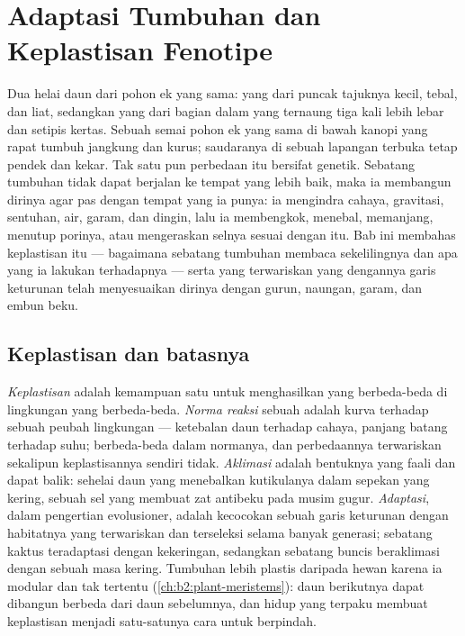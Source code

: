 \chapter{Adaptasi Tumbuhan dan Keplastisan Fenotipe}\label{ch:b2:plant-plasticity}

Dua helai daun dari pohon ek yang sama: yang dari puncak tajuknya
kecil, tebal, dan liat, sedangkan yang dari bagian dalam yang ternaung
tiga kali lebih lebar dan setipis kertas. Sebuah semai pohon ek yang
sama di bawah kanopi yang rapat tumbuh jangkung dan kurus; saudaranya
di sebuah lapangan terbuka tetap pendek dan kekar. Tak satu pun
perbedaan itu bersifat genetik. Sebatang tumbuhan tidak dapat berjalan
ke tempat yang lebih baik, maka ia membangun dirinya agar pas dengan
tempat yang ia punya: ia mengindra cahaya, gravitasi, sentuhan, air,
garam, dan dingin, lalu ia membengkok, menebal, memanjang, menutup
porinya, atau mengeraskan selnya sesuai dengan itu. Bab ini membahas
keplastisan itu --- bagaimana sebatang tumbuhan membaca sekelilingnya
dan apa yang ia lakukan terhadapnya --- serta  yang terwariskan
yang dengannya garis keturunan telah menyesuaikan dirinya dengan gurun,
naungan, garam, dan embun beku.

\section{Keplastisan dan batasnya}

\begin{definition}\label{def:b2:plant-plasticity:plasticity}
\emph{Keplastisan } adalah kemampuan satu  untuk
menghasilkan  yang berbeda-beda di lingkungan yang
berbeda-beda. \emph{Norma reaksi} sebuah  adalah kurva
 terhadap sebuah peubah lingkungan --- ketebalan daun
terhadap cahaya, panjang batang terhadap suhu;  berbeda-beda
dalam normanya, dan perbedaannya terwariskan sekalipun keplastisannya
sendiri tidak. \emph{Aklimasi} adalah bentuknya yang faali dan dapat
balik: sehelai daun yang menebalkan kutikulanya dalam sepekan yang
kering, sebuah sel yang membuat zat antibeku pada musim gugur.
\emph{Adaptasi}, dalam pengertian evolusioner, adalah kecocokan sebuah
garis keturunan dengan habitatnya yang terwariskan dan terseleksi
selama banyak generasi; sebatang kaktus teradaptasi dengan kekeringan,
sedangkan sebatang buncis beraklimasi dengan sebuah masa kering.
Tumbuhan lebih plastis daripada hewan karena ia modular dan tak
tertentu (\cref{ch:b2:plant-meristems}): daun berikutnya dapat dibangun
berbeda dari daun sebelumnya, dan hidup yang terpaku membuat
keplastisan menjadi satu-satunya cara untuk berpindah.
\end{definition}

